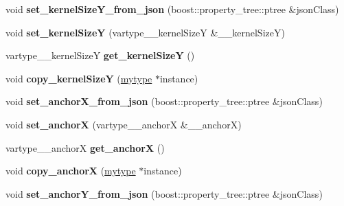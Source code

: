 \begin{DoxyCompactItemize}
void {\bfseries set\+\_\+kernel\+Size\+Y\+\_\+from\+\_\+json} (boost\+::property\+\_\+tree\+::ptree \&json\+Class)
\item 
\mbox{\label{classfilter_1_1algos_1_1_erode_a4933bc5cc3c5aa822ee0efc461df09bd}} 
void {\bfseries set\+\_\+kernel\+SizeY} (vartype\+\_\+\+\_\+kernel\+SizeY \&\+\_\+\+\_\+kernel\+SizeY)
\item 
\mbox{\label{classfilter_1_1algos_1_1_erode_a299149c462c4059716657a5f6775c269}} 
vartype\+\_\+\+\_\+kernel\+SizeY {\bfseries get\+\_\+kernel\+SizeY} ()
\item 
\mbox{\label{classfilter_1_1algos_1_1_erode_aa6cf1c5ba5ab7900de746ef94457c28f}} 
void {\bfseries copy\+\_\+kernel\+SizeY} (\hyperlink{classfilter_1_1algos_1_1_erode}{mytype} $\ast$instance)
\item 
\mbox{\label{classfilter_1_1algos_1_1_erode_aaeb950e83cd0141c154b8f553c34b387}} 
void {\bfseries set\+\_\+anchor\+X\+\_\+from\+\_\+json} (boost\+::property\+\_\+tree\+::ptree \&json\+Class)
\item 
\mbox{\label{classfilter_1_1algos_1_1_erode_aafe71bf03f3f577ef490b1d1327f4ec9}} 
void {\bfseries set\+\_\+anchorX} (vartype\+\_\+\+\_\+anchorX \&\+\_\+\+\_\+anchorX)
\item 
\mbox{\label{classfilter_1_1algos_1_1_erode_a295542f1145a19e764f4722eb72cbc6c}} 
vartype\+\_\+\+\_\+anchorX {\bfseries get\+\_\+anchorX} ()
\item 
\mbox{\label{classfilter_1_1algos_1_1_erode_a8c24363a78ff22e5bbe6105ac10426ac}} 
void {\bfseries copy\+\_\+anchorX} (\hyperlink{classfilter_1_1algos_1_1_erode}{mytype} $\ast$instance)
\item 
\mbox{\label{classfilter_1_1algos_1_1_erode_aae017ac91c239c51569f7be55c6eff83}} 
void {\bfseries set\+\_\+anchor\+Y\+\_\+from\+\_\+json} (boost\+::property\+\_\+tree\+::ptree \&json\+Class)
\item 
\mbox{\label{classfilter_1_1algos_1_1_erode_a0ff67e691820bdf696f264836c806ca1}} 

\end{DoxyCompactItemize}
